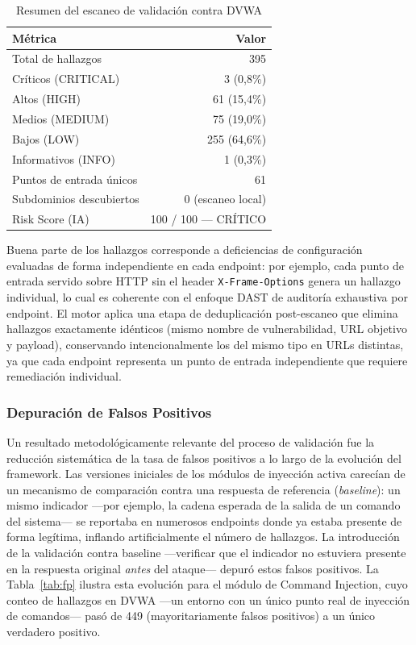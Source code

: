 \documentclass[12pt, a4paper]{article}
\begin{document}
\begin{table}[H]
    \centering
    \caption{Resumen del escaneo de validación contra DVWA}
    \label{tab:scan-dvwa}
    \begin{tabular}{l r}
        \toprule
        \textbf{Métrica} & \textbf{Valor} \\
        \midrule
        Total de hallazgos        & 395 \\
        Críticos (CRITICAL)       & 3 (0,8\%) \\
        Altos (HIGH)              & 61 (15,4\%) \\
        Medios (MEDIUM)           & 75 (19,0\%) \\
        Bajos (LOW)               & 255 (64,6\%) \\
        Informativos (INFO)       & 1 (0,3\%) \\
        Puntos de entrada únicos  & 61 \\
        Subdominios descubiertos  & 0 (escaneo local) \\
        Risk Score (IA)           & 100 / 100 --- CRÍTICO \\
        \bottomrule
    \end{tabular}
\end{table}

Buena parte de los hallazgos corresponde a deficiencias de configuración
evaluadas de forma independiente en cada endpoint: por ejemplo, cada punto de
entrada servido sobre HTTP sin el header \texttt{X-Frame-Options} genera un
hallazgo individual, lo cual es coherente con el enfoque DAST de auditoría
exhaustiva por endpoint. El motor aplica una etapa de deduplicación
post-escaneo que elimina hallazgos exactamente idénticos (mismo nombre de
vulnerabilidad, URL objetivo y payload), conservando intencionalmente los del
mismo tipo en URLs distintas, ya que cada endpoint representa un punto de
entrada independiente que requiere remediación individual.

\subsubsection{Depuración de Falsos Positivos}

Un resultado metodológicamente relevante del proceso de validación fue la
reducción sistemática de la tasa de falsos positivos a lo largo de la
evolución del framework. Las versiones iniciales de los módulos de inyección
activa carecían de un mecanismo de comparación contra una respuesta de
referencia (\textit{baseline}): un mismo indicador ---por ejemplo, la cadena
esperada de la salida de un comando del sistema--- se reportaba en numerosos
endpoints donde ya estaba presente de forma legítima, inflando artificialmente
el número de hallazgos. La introducción de la validación contra baseline
---verificar que el indicador no estuviera presente en la respuesta original
\textit{antes} del ataque--- depuró estos falsos positivos. La
Tabla~\ref{tab:fp} ilustra esta evolución para el módulo de Command Injection,
cuyo conteo de hallazgos en DVWA ---un entorno con un único punto real de
inyección de comandos--- pasó de 449 (mayoritariamente falsos positivos) a un
único verdadero positivo.
\end{document}
